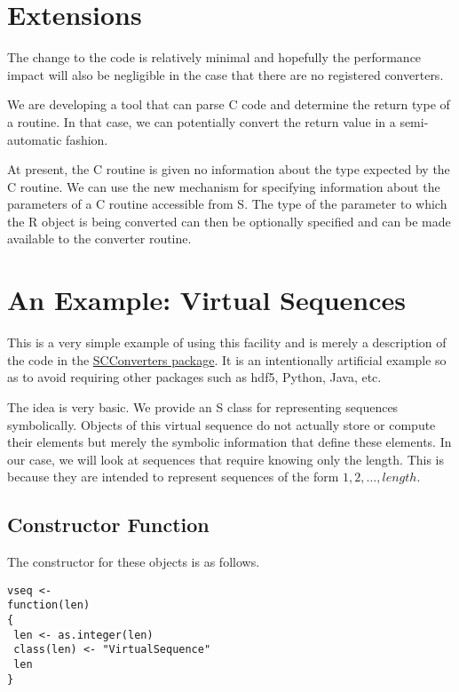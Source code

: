\documentclass{article}
\begin{document}
\section{Extensions}

The change to the code is relatively minimal and hopefully the
performance impact will also be negligible in the case that there are
no registered converters.

We are developing a tool that can parse C code and determine the
return type of a routine. In that case, we can potentially convert the
return value in a semi-automatic fashion.


At present, the C routine is given no information about the type
expected by the C routine. We can use the new
\href{http://cm.bell-labs.com/stat/duncan/DynamicCSymbols.ps}{}
mechanism for specifying information about the parameters of a C
routine accessible from S. The type of the parameter to which the R
object is being converted can then be optionally specified and can be
made available to the converter routine.


\section{An Example: Virtual Sequences}
This is a very simple example of using this facility and is merely a
description of the code in the
\href{http://cm.bell-labs.com/stat/duncan/SCConverters/SCConverters_1.0-0.tar.gz}
{SCConverters package}.  It is an intentionally artificial example so
as to avoid requiring other packages such as hdf5, Python, Java, etc.

The idea is very basic.  We provide an S class for representing
sequences symbolically. Objects of this virtual sequence do not
actually store or compute their elements but merely the symbolic
information that define these elements.  In our case, we will look at
sequences that require knowing only the length. This is because they
are intended to represent sequences of the form $1, 2, \ldots,
length$.

\subsection{Constructor Function}
The constructor for these objects is as follows.
\begin{verbatim}
vseq <-
function(len)
{
 len <- as.integer(len)
 class(len) <- "VirtualSequence"
 len
}

\end{verbatim}
\end{document}
